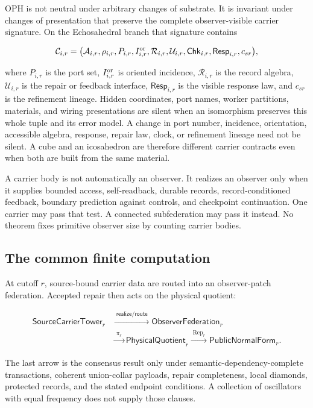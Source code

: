 OPH is not neutral under arbitrary changes of substrate. It is invariant under
changes of presentation that preserve the complete observer-visible carrier
signature. On the Echosahedral branch that signature contains

\[
\mathcal C_{i,r}=
\bigl(
\mathcal A_{i,r},\rho_{i,r},P_{i,r},I_{i,r}^{\rm or},
\mathcal R_{i,r},\mathcal U_{i,r},\mathsf{Chk}_{i,r},
\mathsf{Resp}_{i,r},c_{sr}
\bigr),
\]

where \(P_{i,r}\) is the port set, \(I_{i,r}^{\rm or}\) is oriented
incidence, \(\mathcal R_{i,r}\) is the record algebra,
\(\mathcal U_{i,r}\) is the repair or feedback interface,
\(\mathsf{Resp}_{i,r}\) is the visible response law, and \(c_{sr}\) is the
refinement lineage. Hidden coordinates, port names, worker partitions,
materials, and wiring presentations are silent when an isomorphism preserves
this whole tuple and its error model. A change in port number, incidence,
orientation, accessible algebra, response, repair law, clock, or refinement
lineage need not be silent. A cube and an icosahedron are therefore different
carrier contracts even when both are built from the same material.

A carrier body is not automatically an observer. It realizes an observer only
when it supplies bounded access, self-readback, durable records,
record-conditioned feedback, boundary prediction against controls, and
checkpoint continuation. One carrier may pass that test. A connected
subfederation may pass it instead. No theorem fixes primitive observer size by
counting carrier bodies.

\subsection*{The common finite computation}

At cutoff \(r\), source-bound carrier data are routed into an observer-patch
federation. Accepted repair then acts on the physical quotient:

\[
\begin{aligned}
\mathsf{SourceCarrierTower}_r
&\xrightarrow{\;\mathsf{realize/route}\;}
\mathsf{ObserverFederation}_r\\
&\xrightarrow{\;\pi_r\;}
\mathsf{PhysicalQuotient}_r
\xrightarrow{\;\operatorname{Rep}_r\;}
\mathsf{PublicNormalForm}_r.
\end{aligned}
\]

The last arrow is the consensus result only under semantic-dependency-complete
transactions, coherent union-collar payloads, repair completeness, local
diamonds, protected records, and the stated endpoint conditions. A collection
of oscillators with equal frequency does not supply those clauses.

